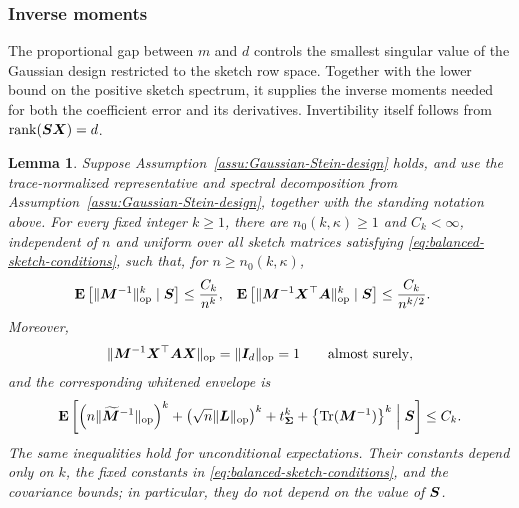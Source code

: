 \documentclass{article}
\theoremstyle{plain} %
\newtheorem{lemma}[theorem]{Lemma}
\theoremstyle{definition} %
\theoremstyle{definition} %
\begin{document}
\subsubsection{Inverse moments}

The proportional gap between $m$ and $d$ controls the smallest singular
value of the Gaussian design restricted to the sketch row space.  Together
with the lower bound on the positive sketch spectrum, it supplies the
inverse moments needed for both the coefficient error and its derivatives.
Invertibility itself follows from $\operatorname{rank}(\boldsymbol{S}\boldsymbol{X})=d$.

\begin{lemma}
\label{lem:M-inverse-bound}
Suppose Assumption~\ref{assu:Gaussian-Stein-design} holds, and use the
trace-normalized
representative and spectral decomposition from
Assumption~\ref{assu:Gaussian-Stein-design}, together with the standing
notation above.
For every fixed integer $k\geq1$, there are $n_0(k,\kappa)\geq1$ and
$C_k<\infty$, independent of $n$ and uniform over all sketch matrices
satisfying \eqref{eq:balanced-sketch-conditions}, such that, for
$n\geq n_0(k,\kappa)$,
\begin{align}
    {\mathbf{E}}\left[\lVert\boldsymbol{M}^{-1}\rVert_{\rm op}^k\mid\boldsymbol{S}\right]
    &\leq \frac{C_k}{n^k},
    &
    {\mathbf{E}}\left[\lVert\boldsymbol{M}^{-1}\boldsymbol{X}^\top\boldsymbol{A}\rVert_{\rm op}^k\mid\boldsymbol{S}\right]
    &\leq \frac{C_k}{n^{k/2}}.
    \label{eq:M-inverse-moments}
\end{align}
Moreover,
\begin{align}
    \lVert\boldsymbol{M}^{-1}\boldsymbol{X}^\top\boldsymbol{A}\boldsymbol{X}\rVert_{\rm op}
    =\lVert\boldsymbol{I}_d\rVert_{\rm op}=1
    \qquad\text{almost surely},
    \label{eq:M-inverse-normal-equation}
\end{align}
and the corresponding whitened envelope is
\begin{align}
    {\mathbf{E}}\left[
       \left(n\lVert\widetilde{\boldsymbol{M}}^{-1}\rVert_{\rm op}\right)^k
       +\left(\sqrt n\lVert\boldsymbol{L}\rVert_{\rm op}\right)^k
       +t_{\boldsymbol{\Sigma}}^k
       +\left\{\operatorname{Tr}(\boldsymbol{M}^{-1})\right\}^k
       \mathrel{\Big|}\boldsymbol{S}
    \right]
    \leq C_k.
    \label{eq:M-inverse-whitened-envelope}
\end{align}
The same inequalities hold for unconditional expectations.  Their constants
depend only on $k$, the fixed constants in
\eqref{eq:balanced-sketch-conditions}, and the covariance bounds; in
particular, they do not depend on the value of $\boldsymbol{S}$.
\end{lemma}
\end{document}
